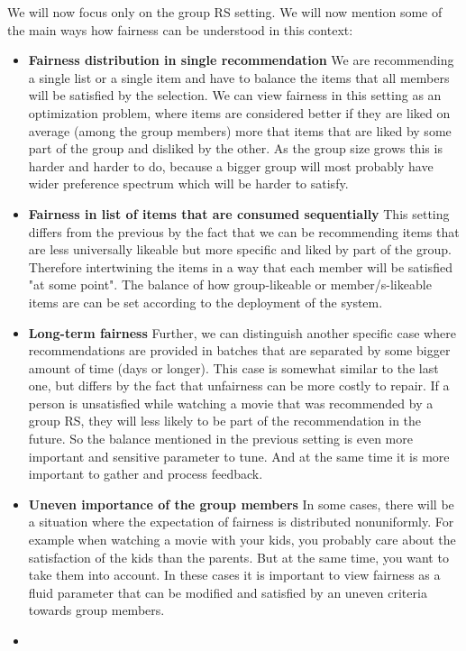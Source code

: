 
We will now focus only on the group RS setting. We will now mention some of the main ways how fairness can be understood in this context:

\begin{itemize}
    \item \textbf{Fairness distribution in single recommendation}\newline
    We are recommending a single list or a single item and have to balance the items that all members will be satisfied by the selection. We can view fairness in this setting as an optimization problem, where items are considered better if they are liked on average (among the group members) more that items that are liked by some part of the group and disliked by the other. As the group size grows this is harder and harder to do, because a bigger group will most probably have wider preference spectrum which will be harder to satisfy.
    
    \item \textbf{Fairness in list of items that are consumed sequentially}
    This setting differs from the previous by the fact that we can be recommending items that are less universally likeable but more specific and liked by part of the group. Therefore intertwining the items in a way that each member will be satisfied "at some point". The balance of how group-likeable or member/s-likeable items are can be set according to the deployment of the system.
    
    \item \textbf{Long-term fairness}\newline
    Further, we can distinguish another specific case where recommendations are provided in batches that are separated by some bigger amount of time (days or longer). This case is somewhat similar to the last one, but differs by the fact that unfairness can be more costly to repair. If a person is unsatisfied while watching a movie that was recommended by a group RS, they will less likely to be part of the recommendation in the future. So the balance mentioned in the previous setting is even more important and sensitive parameter to tune. And at the same time it is more important to gather and process feedback.
    
    \item \textbf{Uneven importance of the group members}
    In some cases, there will be a situation where the expectation of fairness is distributed nonuniformly. For example when watching a movie with your kids, you probably care about the satisfaction of the kids than the parents. But at the same time, you want to take them into account. In these cases it is important to view fairness as a fluid parameter that can be modified and satisfied by an uneven criteria towards group members.
    
    \item
    
\end{itemize}

